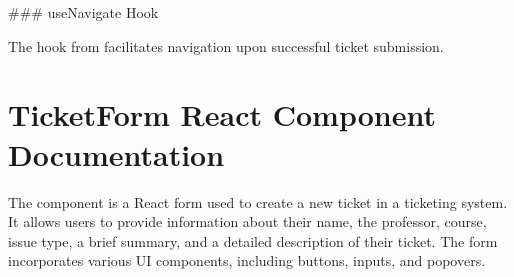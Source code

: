 \documentclass[letterpaper,10pt,english]{sphinxmanual}
\begin{document}
\sphinxAtStartPar
\#\#\# useNavigate Hook

\sphinxAtStartPar
The  hook from  facilitates navigation upon successful ticket submission.


\section{TicketForm React Component Documentation}
\label{\detokenize{forms/ticket:ticketform-react-component-documentation}}
\sphinxAtStartPar
The  component is a React form used to create a new ticket in a ticketing system. It allows users to provide information about their name, the professor, course, issue type, a brief summary, and a detailed description of their ticket. The form incorporates various UI components, including buttons, inputs, and popovers.
\end{document}
